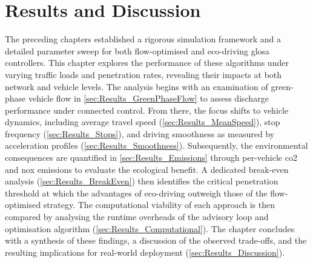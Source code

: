 \chapter{Results and Discussion}
\label{ch:ResultsDiscussion}

The preceding chapters established a rigorous simulation framework and a detailed parameter sweep for both flow-optimised and eco-driving \ac{glosa} controllers. This chapter explores the performance of these algorithms under varying traffic loads and penetration rates, revealing their impacts at both network and vehicle levels.
\mynewline
The analysis begins with an examination of green-phase vehicle flow in \ref{sec:Results_GreenPhaseFlow} to assess discharge performance under connected control. From there, the focus shifts to vehicle dynamics, including average travel speed (\ref{sec:Results_MeanSpeed}), stop frequency (\ref{sec:Results_Stops}), and driving smoothness as measured by acceleration profiles (\ref{sec:Results_Smoothness}). Subsequently, the environmental consequences are quantified in \ref{sec:Results_Emissions} through per-vehicle \ac{co2} and \ac{nox} emissions to evaluate the ecological benefit. A dedicated break-even analysis (\ref{sec:Results_BreakEven}) then identifies the critical penetration threshold at which the advantages of eco-driving outweigh those of the flow-optimised strategy. The computational viability of each approach is then compared by analysing the runtime overheads of the advisory loop and optimisation algorithm (\ref{sec:Results_Computational}). The chapter concludes with a synthesis of these findings, a discussion of the observed trade-offs, and the resulting implications for real-world deployment (\ref{sec:Results_Discussion}).















